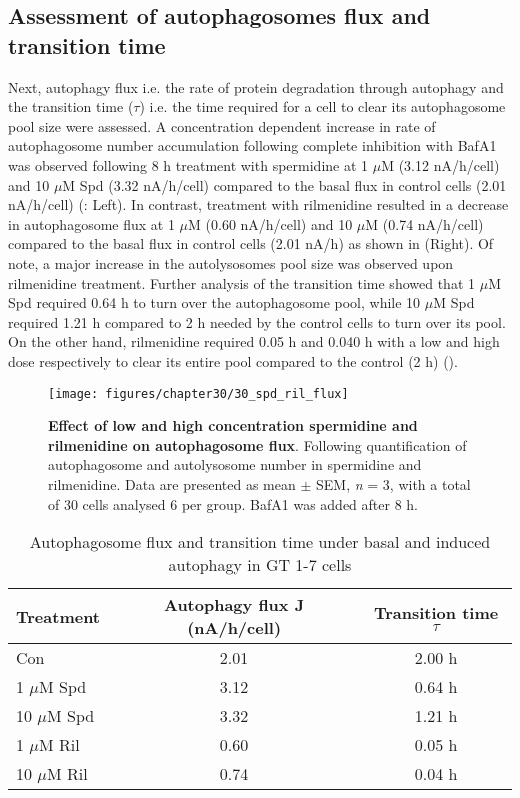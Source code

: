 {\subsection{Assessment of autophagosomes flux and transition time}
Next, autophagy flux i.e. the rate of protein degradation through autophagy \citep{klionsky2016,loos2014} and the transition time ($\tau$) i.e. the time required for a cell to clear its autophagosome pool size \citep{DuToit2018b,loos2014} were assessed. A concentration dependent increase in rate of autophagosome number accumulation following complete inhibition with BafA1 was observed following 8 h treatment with spermidine at 1 $\mu$M (3.12 nA/h/cell) and 10 $\mu$M Spd (3.32 nA/h/cell) compared to the basal flux in control cells (2.01 nA/h/cell) (: Left). In contrast, treatment with rilmenidine resulted in a decrease in autophagosome flux at 1 $\mu$M (0.60 nA/h/cell) and 10 $\mu$M (0.74 nA/h/cell) compared to the basal flux in control cells (2.01 nA/h) as shown in  (Right). Of note, a major increase in the autolysosomes pool size was observed upon rilmenidine treatment. Further analysis of the transition time showed that 1 $\mu$M Spd required 0.64 h to turn over the autophagosome pool, while 10 $\mu$M Spd required 1.21 h compared to 2 h needed by the control cells to turn over its pool. On the other hand, rilmenidine required 0.05 h and 0.040 h with a low and high dose respectively to clear its entire pool compared to the control (2 h) ().

\begin{figure}[!htbp]
\center
  \texttt{[image: figures/chapter30/30\_spd\_ril\_flux]}
  \caption[Effect of low and high concentration spermidine and rilmenidine on autophagosome flux]{\textbf{Effect of low and high concentration spermidine and rilmenidine on autophagosome flux}. Following quantification of autophagosome and autolysosome number in spermidine and rilmenidine. Data are presented as mean $\pm$ SEM, \textit{n} = 3, with a total of 30 cells analysed 6 per group. BafA1 was added after 8 h.}
  \label{fig:30_spd_ril_flux}
\end{figure} 

\begin{table}[!htbp]
\centering
\caption[Autophagosome flux and transition time under basal and induced autophagy in GT 1-7 cells]{Autophagosome flux and transition time under basal and induced autophagy in GT 1-7 cells}
\label{tab:30_flux}
  \begin{tabular}{lcc}
\toprule
Treatment & Autophagy flux J (nA/h/cell) & Transition time $\tau$\\
\midrule
Con & 2.01 & 2.00 h \\
1 $\mu$M Spd & 3.12 & 0.64 h \\
10 $\mu$M Spd & 3.32 & 1.21 h \\
1 $\mu$M Ril & 0.60 & 0.05 h \\
10 $\mu$M Ril & 0.74 & 0.04 h \\
\end{tabular}
\end{table}

}
